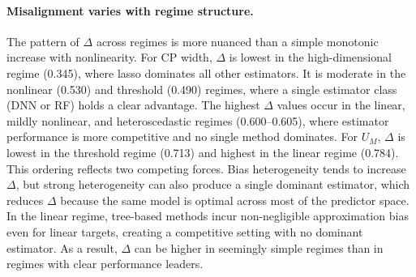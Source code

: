 \documentclass[a4paper,11pt]{article}
\begin{document}
\paragraph{Misalignment varies with regime structure.}
The pattern of $\Delta$ across regimes is more nuanced than a simple monotonic increase with nonlinearity. For CP width, $\Delta$ is lowest in the high-dimensional regime (0.345), where lasso dominates all other estimators. It is moderate in the nonlinear (0.530) and threshold (0.490) regimes, where a single estimator class (DNN or RF) holds a clear advantage. The highest $\Delta$ values occur in the linear, mildly nonlinear, and heteroscedastic regimes (0.600--0.605), where estimator performance is more competitive and no single method dominates. For $U_M$, $\Delta$ is lowest in the threshold regime (0.713) and highest in the linear regime (0.784). This ordering reflects two competing forces. Bias heterogeneity tends to increase $\Delta$, but strong heterogeneity can also produce a single dominant estimator, which reduces $\Delta$ because the same model is optimal across most of the predictor space. In the linear regime, tree-based methods incur non-negligible approximation bias even for linear targets, creating a competitive setting with no dominant estimator. As a result, $\Delta$ can be higher in seemingly simple regimes than in regimes with clear performance leaders.
\end{document}
